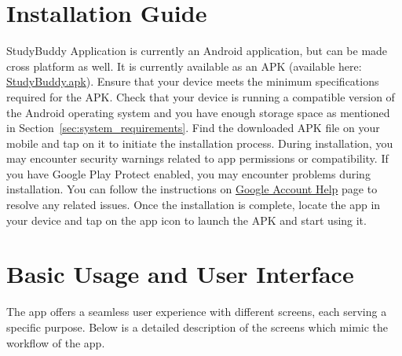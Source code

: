 \section{Installation Guide}\label{sec:installation_guide}
StudyBuddy Application is currently an Android application, but can be made cross platform as well. It is currently available as an APK (available here: \href{https://expo.dev/artifacts/eas/ng8GY8bBaAD6gXzhV4b33t.apk}{StudyBuddy.apk})\label{apkproblem}. Ensure that your device meets the minimum specifications required for the APK. Check that your device is running a compatible version of the Android operating system and you have enough storage space as mentioned in Section~\ref{sec:system_requirements}. Find the downloaded APK file on your mobile and tap on it to initiate the installation process. During installation, you may encounter security warnings related to app permissions or compatibility. If you have Google Play Protect enabled, you may encounter problems during installation. You can follow the instructions on \href{https://support.google.com/accounts/answer/2812853?hl=en#zippy=%2Cinformation-for-developers:~:text=How%20to%20turn%20Google%20Play%20Protect%20on%20or%20off}{Google Account Help} page to resolve any related issues. Once the installation is complete, locate the app in your device and tap on the app icon to launch the APK and start using it.

\section{Basic Usage and User Interface}\label{sec:user_flow}
The app offers a seamless user experience with different screens, each serving a specific purpose. Below is a detailed description of the screens which mimic the workflow of the app.

